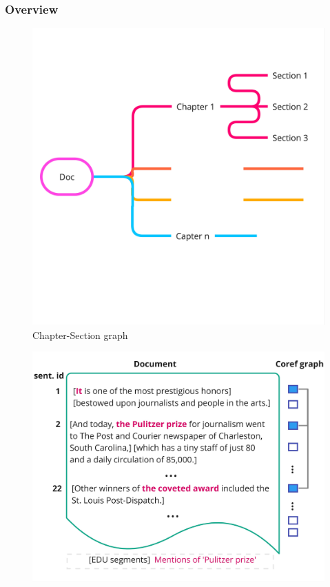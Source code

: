 \documentclass{beamer}
\begin{document}
\begin{frame}
  \frametitle{Overview}

  \begin{minipage}[t][0.6\textheight][t]{\textwidth}
    \centering
    \begin{minipage}{0.3\textwidth}
      \centering
        \begin{figure}[ht]
            \centering
            \includegraphics[width=\textwidth]{imgs/chapter_section_.jpg}
            \caption*{Chapter-Section graph}
        \end{figure}
    \end{minipage}%
    \hfill
    \begin{minipage}{0.3\textwidth}
      \centering
        \begin{figure}[ht]
            \centering
            \includegraphics[width=\textwidth]{imgs/co-reference-example.jpg}

\end{figure}
\end{minipage}
\end{minipage}
\end{frame}
\end{document}
